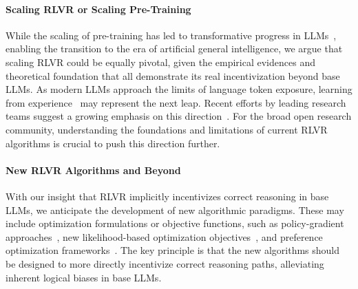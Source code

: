 \paragraph{Scaling RLVR or Scaling Pre-Training}
While the scaling of pre-training has led to transformative progress in LLMs~\citep{kaplan2020ScalingLaws,liu2024deepseek-v3}, enabling the transition to the era of artificial general intelligence, we argue that scaling RLVR could be equally pivotal, given the empirical evidences and theoretical foundation that all demonstrate its real incentivization beyond base LLMs. As modern LLMs approach the limits of language token exposure, learning from experience~\citep{silver2025EraOfExp} may represent the next leap. Recent efforts by leading research teams suggest a growing emphasis on this direction~\citep{guo2025deepseek-r1,deepseek2025R1-0528,google2024Gemini2.0,xai2025GrokBeta3,openai2025o3-o4m,qwen2025Qwen3,google2025Gemini-2.5-Pro,anthropic2025Claude4,mistral2025Magistral}. For the broad open research community, understanding the foundations and limitations of current RLVR algorithms is crucial to push this direction further.


\paragraph{New RLVR Algorithms and Beyond}
With our insight that RLVR implicitly incentivizes correct reasoning in base LLMs, we anticipate the development of new algorithmic paradigms. These may include optimization formulations or objective functions, such as policy-gradient approaches~\citep{sutton1999PolicyGrad,schulman2017PPO}, new likelihood-based optimization objectives~\citep{chen2025NFT,zhu2025PosNegRLVR}, and preference optimization frameworks~\citep{rafailov2023DPO,su2025TRPA}. The key principle is that the new algorithms should be designed to more directly incentivize correct reasoning paths, alleviating inherent logical biases in base LLMs.




